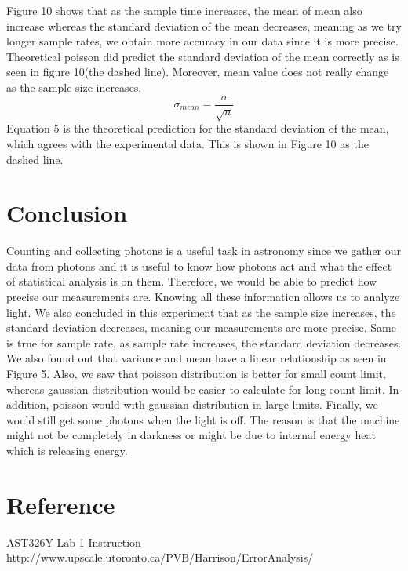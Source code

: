 \documentclass[letterpaper,12pt]{article}
\begin{document}
\newpage
Figure 10 shows that as the sample time increases, the mean of mean also increase whereas the standard deviation of the mean decreases, meaning as we try longer sample rates, we obtain more accuracy in our data since it is more precise. Theoretical poisson did predict the standard deviation of the mean correctly as is seen in figure 10(the dashed line). Moreover, mean value does not really change as the sample size increases.
\begin{equation}
\label{sigma}
\sigma_{mean}= \frac{\sigma}{\sqrt{n}}
\end{equation}
Equation 5 is the theoretical prediction for the standard deviation of the mean, which agrees with the experimental data. This is shown in Figure 10 as the dashed line.


\newpage
\section{Conclusion}
\label{sec:conclusion}
Counting and collecting photons is a useful task in astronomy since we gather our data from photons and it is useful to know how photons act and what the effect of statistical analysis is on them. Therefore, we would be able to predict how precise our measurements are. Knowing all these information allows us to analyze light.
We also concluded in this experiment that as the sample size increases, the standard deviation decreases, meaning our measurements are more precise. Same is true for sample rate, as sample rate increases, the standard deviation decreases. We also found out that variance and mean have a linear relationship as seen in Figure 5.
Also, we saw that poisson distribution is better for small count limit, whereas gaussian distribution would be easier to calculate for long count limit. In addition, poisson would  with gaussian distribution in large limits. 
Finally, we would still get some photons when the light is off. The reason is that the machine might not be completely in darkness or might be due to internal energy heat which is releasing energy.

\section{Reference}
\label{sec:reference}
AST326Y Lab 1 Instruction
\newline
http://www.upscale.utoronto.ca/PVB/Harrison/ErrorAnalysis/
\end{document}
